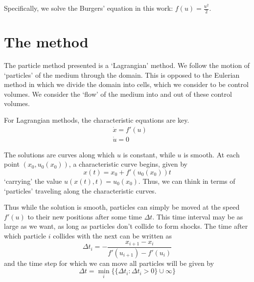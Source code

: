 \documentclass{article}
\begin{document}
Specifically, we solve the Burgers' equation in this work: $f(u) = \frac{u^2}{2}$.

\section{The method}
The particle method presented \cite{particle} is a `Lagrangian' method. We follow the motion of `particles' of the medium through the domain. This is opposed to the Eulerian method in which we divide the domain into cells, which we consider to be control volumes. We consider the `flow' of the medium into and out of these control volumes.

For Lagrangian methods, the characteristic equations are key.
\begin{align}
&\dot{x} = f'(u) \\
&\dot{u} = 0
\end{align}

The solutions are curves along which $u$ is constant, while $u$ is smooth. At each point $(x_0, u_0(x_0))$, a characteristic curve begins, given by
\begin{equation}
x(t) = x_0 + f'(u_0(x_0))t
\end{equation}
`carrying' the value $u(x(t),t) = u_0(x_0)$. Thus, we can think in terms of `particles' traveling along the characteristic curves.

Thus while the solution is smooth, particles can simply be moved at the speed $f'(u)$ to their new positions after some time $\Delta t$. This time interval may be as large as we want, as long as particles don't collide to form shocks. The time after which particle $i$ collides with the next can be written as
\begin{equation}
\Delta t_i = -\frac{x_{i+1}-x_i}{f'(u_{i+1})-f'(u_i)}
\end{equation}
and the time step for which we can move all particles will be given by
\begin{equation}
\Delta t = \min_i \{\{\Delta t_i : \Delta t_i > 0\} \cup \infty \}
\end{equation}
\end{document}
